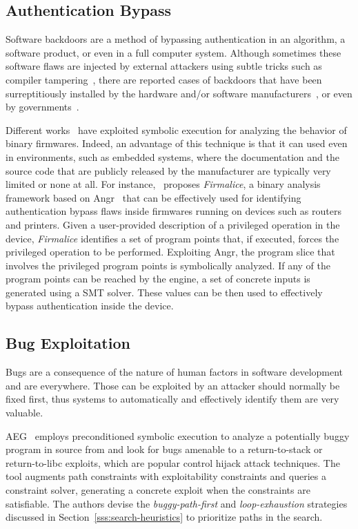 \subsection{Authentication Bypass}
\label{ss:auth-bypass}
Software backdoors are a method of bypassing authentication in an algorithm, a software product, or even in a full computer system. Although sometimes these software flaws are injected by external attackers using subtle tricks such as compiler tampering~\cite{KRS-TR74}, there are reported cases of backdoors that have been surreptitiously installed by the hardware and/or software manufacturers~\cite{CZF-USEC14}, or even by governments~\cite{NSA-BACKDOOR}. 

Different works~\cite{ZBF-NDSS14,DMR-USEC13,FIRMALICE-NDSS15} have exploited symbolic execution for analyzing the behavior of binary firmwares. Indeed, an advantage of this technique is that it can used even in environments, such as embedded systems, where the documentation and the source code that are publicly released by the manufacturer are typically very limited or none at all. For instance,~\cite{FIRMALICE-NDSS15} proposes {\em Firmalice}, a binary analysis framework based on {\sc Angr}~\cite{ANGR-SSP16} that can be effectively used for identifying authentication bypass flaws inside firmwares running on devices such as routers and printers. Given a user-provided description of a privileged operation in the device, {\em Firmalice} identifies a set of program points that, if executed, forces the privileged operation to be performed. Exploiting {\sc Angr}, the program slice that involves the privileged program points is symbolically analyzed. If any of the program points can be reached by the engine, a set of concrete inputs is generated using a SMT solver. These values can be then used to effectively bypass authentication inside the device.

\subsection{Bug Exploitation}
\label{ss:bug-exploitation}
Bugs are a consequence of the nature of human factors in software development and are everywhere. Those can be exploited by an attacker should normally be fixed first, thus systems to automatically and effectively identify them are very valuable.

{\sc AEG}~\cite{AEG-NDSS11} employs preconditioned symbolic execution to analyze a potentially buggy program in source from and look for bugs amenable to a return-to-stack or return-to-libc exploits, which are popular control hijack attack techniques. The tool augments path constraints with exploitability constraints and queries a constraint solver, generating a concrete exploit when the constraints are satisfiable. The authors devise the {\em buggy-path-first} and {\em loop-exhaustion} strategies discussed in Section~\ref{sss:search-heuristics} to prioritize paths in the search. 


